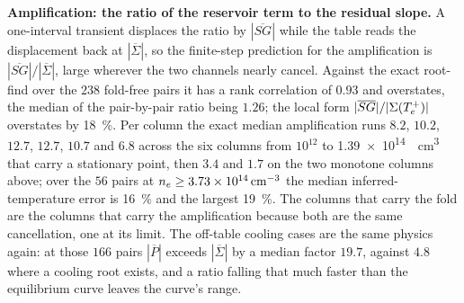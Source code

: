 \textbf{Amplification: the ratio of the reservoir term to the residual
slope.} A one-interval transient displaces the ratio by $|\overline{SG}|$
while the table reads the displacement back at $|\overline{\Sigma}|$, so the
finite-step prediction for the amplification is
$|\overline{SG}|/|\overline{\Sigma}|$, large wherever the two channels nearly
cancel. Against the exact root-find over the $238$ fold-free pairs it has a
rank correlation of $0.93$ and overstates, the median of the pair-by-pair
ratio being $1.26$; the local form $|\overline{SG}|/|\Sigma(T_e^{+})|$
overstates by \SI{18}{\percent}. Per column the exact median amplification
runs $8.2$, $10.2$, $12.7$, $12.7$, $10.7$ and $6.8$ across the six columns
from $10^{12}$ to \SI{1.39e14}{\per\cubic\centi\metre} that carry a stationary
point, then $3.4$ and $1.7$ on the two monotone columns above; over the $56$
pairs at $n_e\ge\SI{3.73e14}{\per\cubic\centi\metre}$ the median
inferred-temperature error is \SI{16}{\percent} and the largest
\SI{19}{\percent}. The columns that carry the fold are the columns that carry
the amplification because both are the same cancellation, one at its limit.
The off-table cooling cases are the same physics again: at those $166$ pairs
$|\overline{P}|$ exceeds $|\overline{\Sigma}|$ by a median factor $19.7$,
against $4.8$ where a cooling root exists, and a ratio falling that much
faster than the equilibrium curve leaves the curve's range.

